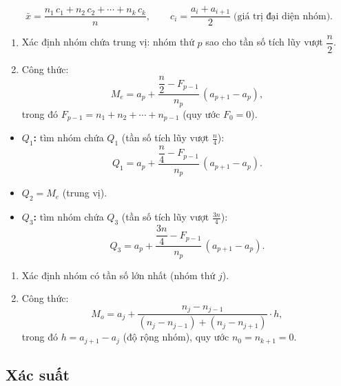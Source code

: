 \documentclass[12pt,a4paper]{article}
\begin{document}
\begin{congthuc}[title={Số trung bình}]
  \[
    \bar{x} = \frac{n_1\,c_1 + n_2\,c_2 + \cdots + n_k\,c_k}{n},
    \qquad c_i = \frac{a_i + a_{i+1}}{2} \;\text{(giá trị đại diện nhóm)}.
  \]
\end{congthuc}

\begin{congthuc}[title={Trung vị $M_e$}]
  \begin{enumerate}
    \item Xác định nhóm chứa trung vị: nhóm thứ $p$ sao cho tần số tích lũy vượt $\dfrac{n}{2}$.
    \item Công thức:
      \[
        M_e = a_p + \frac{\dfrac{n}{2} - F_{p-1}}{n_p}\,(a_{p+1} - a_p),
      \]
      trong đó $F_{p-1} = n_1 + n_2 + \cdots + n_{p-1}$ \;(quy ước $F_0 = 0$).
  \end{enumerate}
\end{congthuc}

\begin{congthuc}[title={Tứ phân vị}]
  \begin{itemize}
    \item \textbf{$Q_1$:} tìm nhóm chứa $Q_1$ (tần số tích lũy vượt $\frac{n}{4}$):
      \[
        Q_1 = a_p + \frac{\dfrac{n}{4} - F_{p-1}}{n_p}\,(a_{p+1} - a_p).
      \]
    \item \textbf{$Q_2 = M_e$} (trung vị).
    \item \textbf{$Q_3$:} tìm nhóm chứa $Q_3$ (tần số tích lũy vượt $\frac{3n}{4}$):
      \[
        Q_3 = a_p + \frac{\dfrac{3n}{4} - F_{p-1}}{n_p}\,(a_{p+1} - a_p).
      \]
  \end{itemize}
\end{congthuc}

\begin{congthuc}[title={Mốt $M_o$}]
  \begin{enumerate}
    \item Xác định nhóm có tần số lớn nhất (nhóm thứ $j$).
    \item Công thức:
      \[
        M_o = a_j + \frac{n_j - n_{j-1}}{(n_j - n_{j-1}) + (n_j - n_{j+1})} \cdot h,
      \]
      trong đó $h = a_{j+1} - a_j$ (độ rộng nhóm), quy ước $n_0 = n_{k+1} = 0$.
  \end{enumerate}
\end{congthuc}

\subsection{Xác suất}
\end{document}
